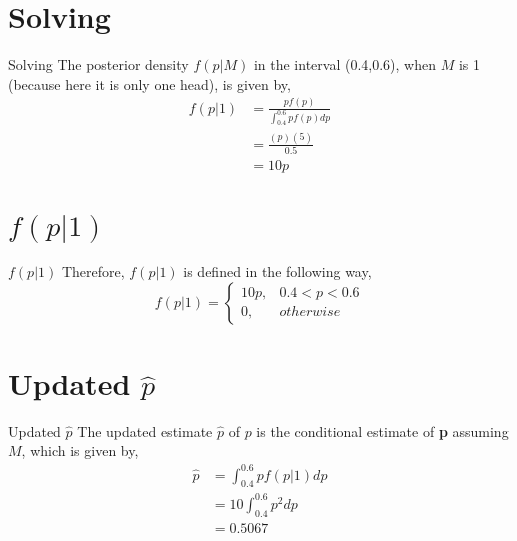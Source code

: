 \documentclass{beamer}
\begin{document}
\section{Solving}
\begin{frame}{Solving}
The posterior density $f(p|M)$ in the interval (0.4,0.6), when $M$ is 1 (because here it is only one head), is given by,
    \begin{align}
           f(p|1) &= \frac{pf(p)}{\int_{0.4}^{0.6}pf(p)dp} \\
                  &= \frac{(p)(5)}{0.5} \\
                  &= 10p
    \end{align}
\end{frame}


\section{$f(p|1)$}
\begin{frame}{$f(p|1)$}
Therefore, $f(p|1)$ is defined in the following way,
    \begin{equation*}
           f(p|1)  = \begin{cases}
                    10p,  & 0.4<p<0.6 \\
                    0,  & otherwise
                   \end{cases}
    \end{equation*}
\end{frame}


\section{Updated $\hat{p}$}
\begin{frame}{Updated $\hat{p}$}
The updated estimate $\hat{p}$ of $p$ is the conditional estimate of \textbf{p} assuming $M$, which is given by,
    \begin{align}
           \hat{p} &= \int_{0.4}^{0.6} pf(p|1)dp \\
                   &= 10\int_{0.4}^{0.6} p^2dp \\
                   &= 0.5067
    \end{align}
\end{frame}
\end{document}
